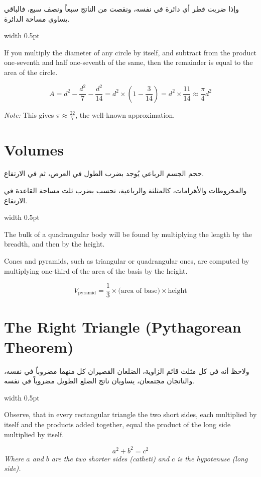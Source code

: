 \documentclass[10pt,a4paper]{book}
\newlength{\colwidth}
\newcommand{\bilingualpair}[2]{%
  \noindent
  \begin{minipage}[t]{\colwidth}
  \begin{flushright}
  \vspace{0pt}
  {\arabicfont\small #1}
  \end{flushright}
  \end{minipage}%
  \hfill\textcolor{columnsepclr}{\vrule width 0.5pt}\hfill
  \begin{minipage}[t]{\colwidth}
  \vspace{0pt}
  {\small #2}
  \end{minipage}%
  \par\vspace{0.6em}
}
\newcommand{\cnote}[1]{\textcolor{notecolor}{\textit{#1}}}
\begin{document}
\bilingualpair{
وإذا ضربت قطر أي دائرة في نفسه، ونقصت من الناتج سبعاً
ونصف سبع، فالباقي يساوي مساحة الدائرة.
}{
If you multiply the diameter of any circle by itself, and subtract from the
product one-seventh and half one-seventh of the same, then the remainder is
equal to the area of the circle.

\begin{equation}
A = d^2 - \frac{d^2}{7} - \frac{d^2}{14} = d^2 \times \left(1 - \frac{3}{14}\right) = d^2 \times \frac{11}{14} \approx \frac{\pi}{4} d^2
\end{equation}

\cnote{Note:} This gives $\pi \approx \frac{22}{7}$, the well-known approximation.
}

\section*{Volumes}

\bilingualpair{
حجم الجسم الرباعي يُوجد بضرب الطول في العرض، ثم في الارتفاع.

والمخروطات والأهرامات، كالمثلثة والرباعية، تحسب بضرب ثلث
مساحة القاعدة في الارتفاع.
}{
The bulk of a quadrangular body will be found by multiplying the length by
the breadth, and then by the height.

Cones and pyramids, such as triangular or quadrangular ones, are computed by
multiplying one-third of the area of the basis by the height.

\begin{equation}
V_{\text{pyramid}} = \frac{1}{3} \times \text{(area of base)} \times \text{height}
\end{equation}
}

\section*{The Right Triangle (Pythagorean Theorem)}

\bilingualpair{
ولاحظ أنه في كل مثلث قائم الزاوية، الضلعان القصيران كل منهما
مضروباً في نفسه، والناتجان مجتمعان، يساويان ناتج الضلع الطويل
مضروباً في نفسه.
}{
Observe, that in every rectangular triangle the two short sides, each
multiplied by itself and the products added together, equal the product of
the long side multiplied by itself.
}

\vspace{0.5em}
\begin{mathbox}[title={\textbf{The Pythagorean Theorem}}]
\begin{equation}
a^2 + b^2 = c^2
\end{equation}
\textit{Where $a$ and $b$ are the two shorter sides (catheti) and $c$ is the
hypotenuse (long side).}
\end{mathbox}
\vspace{0.5em}
\end{document}
